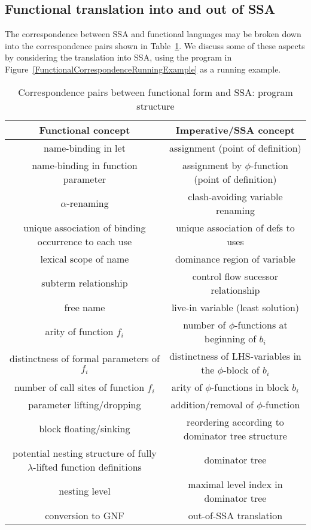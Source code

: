 
\subsection{Functional translation into and out of SSA}

The correspondence between SSA and functional languages may be broken
down into the correspondence pairs shown in
Table~\ref{tableFunctionalCorrespondencesI}. We discuss some of these
aspects by considering the translation into SSA, using the program in
Figure~\ref{FunctionalCorrespondenceRunningExample} as a running
example.

\begin{table}
\begin{tabular}{|c|c|}
  \hline Functional concept & Imperative/SSA concept\\ 
  \hline \hline
  name-binding in let & assignment (point of definition)\\
  name-binding in function parameter & assignment by $\phi$-function
  (point of definition)\\ 
  $\alpha$-renaming & clash-avoiding variable renaming\\
  unique association of binding occurrence to each use & unique
  association of defs to uses\\ 
  lexical scope of name & dominance
  region of variable\\ 
  subterm relationship & control flow sucessor relationship\\
  free name & live-in variable (least
  solution)\\ 
  arity of function $f_i$ & number of
  $\phi$-functions at beginning of $b_i$\\ 
  distinctness of formal
  parameters of $f_i$ & distinctness of LHS-variables in the
  $\phi$-block of $b_i$\\ 
  number of call sites of function $f_i$ &
  arity of $\phi$-functions in block $b_i$\\ 
  parameter lifting/dropping & addition/removal of $\phi$-function\\ 
  block floating/sinking & reordering according to dominator tree
  structure\\
  potential nesting structure of fully $\lambda$-lifted
  function definitions & dominator tree\\
  nesting level & maximal
  level index in dominator tree\\
  conversion to GNF & out-of-SSA translation\\
  \hline
\end{tabular}
\caption{\label{tableFunctionalCorrespondencesI}
  Correspondence pairs between functional form and SSA: program structure}
\end{table}

